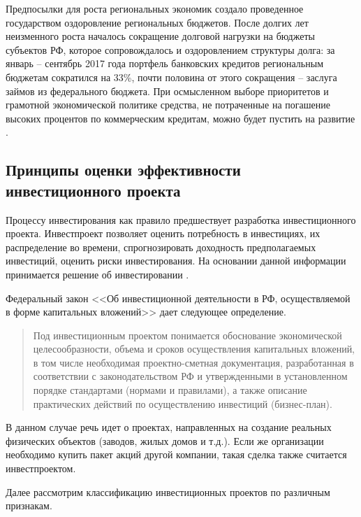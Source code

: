 Предпосылки для роста региональных экономик создало проведенное государством оздоровление региональных бюджетов. После долгих лет неизменного роста началось сокращение долговой нагрузки на бюджеты субъектов РФ, которое сопровождалось и оздоровлением структуры долга: за январь – сентябрь 2017 года портфель банковских кредитов региональным бюджетам сократился на 33\%, почти половина от этого сокращения – заслуга займов из федерального бюджета. При осмысленном выборе приоритетов и грамотной экономической политике средства, не потраченные на погашение высоких процентов по коммерческим кредитам, можно будет пустить на развитие \cite{expertra}.












\subsection{Принципы оценки эффективности инвестиционного проекта}

Процессу инвестирования как правило предшествует разработка инвестиционного проекта. Инвестпроект позволяет оценить потребность в инвестициях, их распределение во времени, спрогнозировать доходность предполагаемых инвестиций, оценить риски инвестирования. На основании данной информации принимается решение об инвестировании \cite[с. 82]{borisova}.

Федеральный закон <<Об инвестиционной деятельности в РФ, осуществляемой в форме капитальных вложений>> \cite{39-fz} дает следующее определение.
\begin{quote}
	Под инвестиционным проектом понимается обоснование экономической целесообразности, объема и сроков осуществления капитальных вложений, в том числе необходимая проектно-сметная документация, разработанная в соответствии с законодательством РФ и утвержденными в установленном порядке стандартами (нормами и правилами), а также описание практических действий по осуществлению инвестиций (бизнес-план).
\end{quote}


В данном случае речь идет о проектах, направленных на создание реальных физических объектов (заводов, жилых домов и т.д.). Если же организации необходимо купить пакет акций другой компании, такая сделка также считается инвестпроектом.

Далее рассмотрим классификацию инвестиционных проектов по различным признакам.

